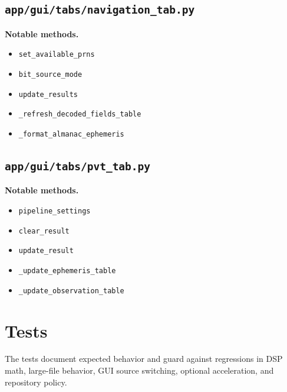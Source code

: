 \documentclass[11pt,a4paper]{article}
\newcommand{\codepath}[1]{\nolinkurl{#1}}
\newcommand{\codeheading}[1]{\texorpdfstring{\codepath{#1}}{#1}}
\newcommand{\codesym}[1]{\nolinkurl{#1}}
\newcommand{\apisym}[1]{\item \codesym{#1}}
\begin{document}
\subsection{\codeheading{app/gui/tabs/navigation_tab.py}}

\textbf{Notable methods.}
\begin{itemize}
  \apisym{set_available_prns}
  \apisym{bit_source_mode}
  \apisym{update_results}
  \apisym{\_refresh_decoded_fields_table}
  \apisym{\_format_almanac_ephemeris}
\end{itemize}

\subsection{\codeheading{app/gui/tabs/pvt_tab.py}}

\textbf{Notable methods.}
\begin{itemize}
  \apisym{pipeline_settings}
  \apisym{clear_result}
  \apisym{update_result}
  \apisym{\_update_ephemeris_table}
  \apisym{\_update_observation_table}
\end{itemize}

\section{Tests}

The tests document expected behavior and guard against regressions in DSP math, large-file behavior, GUI source switching, optional acceleration, and repository policy.
\end{document}
